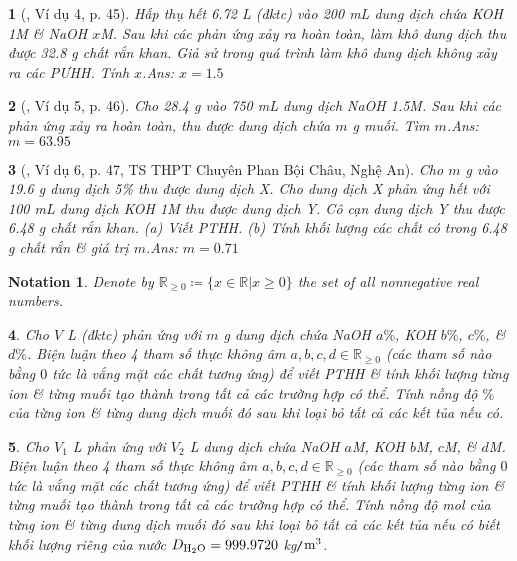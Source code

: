 \documentclass{article}
\newtheorem{baitoan}{}
\newtheorem{notation}{Notation}
\begin{document}
\begin{baitoan}[\cite{Truong_Long_Huong_bdhsg_Hoa_Hoc_9}, Ví dụ 4, p. 45]
	Hấp thụ hết {\rm6.72 L } (đktc) vào {\rm200 mL} dung dịch chứa {\rm KOH 1M} \& {\rm NaOH $x$M}. Sau khi các phản ứng xảy ra hoàn toàn, làm khô dung dịch thu được {\rm32.8 g} chất rắn khan. Giả sử trong quá trình làm khô dung dịch không xảy ra các {\rm PƯHH}. Tính $x$.\hfill{\sf Ans: $x = 1.5$}
\end{baitoan}

\begin{baitoan}[\cite{Truong_Long_Huong_bdhsg_Hoa_Hoc_9}, Ví dụ 5, p. 46]
	Cho {\rm28.4 g } vào {\rm750 mL} dung dịch {\rm NaOH 1.5M}. Sau khi các phản ứng xảy ra hoàn toàn, thu được dung dịch chứa $m$ {\rm g} muối. Tìm $m$.\hfill{\sf Ans: $m = 63.95$}
\end{baitoan}

\begin{baitoan}[\cite{Truong_Long_Huong_bdhsg_Hoa_Hoc_9}, Ví dụ 6, p. 47, TS THPT Chuyên Phan Bội Châu, Nghệ An]
	Cho $m$ {\rm g } vào {\rm19.6 g} dung dịch {\rm{} 5\%} thu được dung dịch X. Cho dung dịch X phản ứng hết với {\rm100 mL} dung dịch {\rm KOH 1M} thu được dung dịch Y. Cô cạn dung dịch Y thu được {\rm6.48 g} chất rắn khan. (a) Viết {\rm PTHH}. (b) Tính khối lượng các chất có trong {\rm6.48 g} chất rắn \& giá trị $m$.\hfill{\sf Ans: $m = 0.71$}
\end{baitoan}

\begin{notation}
	Denote by $\mathbb{R}_{\ge0}\coloneqq\{x\in\mathbb{R}|x\ge0\}$ the set of all nonnegative real numbers.
\end{notation}

\begin{baitoan}
	Cho $V$ {\rm L } (đktc) phản ứng với $m$ {\rm g} dung dịch chứa {\rm NaOH $a\%$, KOH $b\%$,  $c\%$, \&  $d\%$}. Biện luận theo 4 tham số thực không âm $a,b,c,d\in\mathbb{R}_{\ge0}$ (các tham số nào bằng $0$ tức là vắng mặt các chất tương ứng) để viết {\rm PTHH} \& tính khối lượng từng ion \& từng muối tạo thành trong tất cả các trường hợp có thể. Tính nồng độ $\%$ của từng ion \& từng dung dịch muối đó sau khi loại bỏ tất cả các kết tủa nếu có.
\end{baitoan}

\begin{baitoan}
	Cho $V_1$ {\rm L } phản ứng với $V_2$ {\rm L} dung dịch chứa {\rm NaOH $a$M, KOH $b$M,  $c$M, \&  $d$M}. Biện luận theo 4 tham số thực không âm $a,b,c,d\in\mathbb{R}_{\ge0}$ (các tham số nào bằng $0$ tức là vắng mặt các chất tương ứng) để viết {\rm PTHH} \& tính khối lượng từng ion \& từng muối tạo thành trong tất cả các trường hợp có thể. Tính nồng độ mol của từng ion \& từng dung dịch muối đó sau khi loại bỏ tất cả các kết tủa nếu có biết khối lượng riêng của nước $D_{\ce{H2O}} = 999.9720$ {\rm kg{\tt/}$\rm m^3$}.
\end{baitoan}
\end{document}
